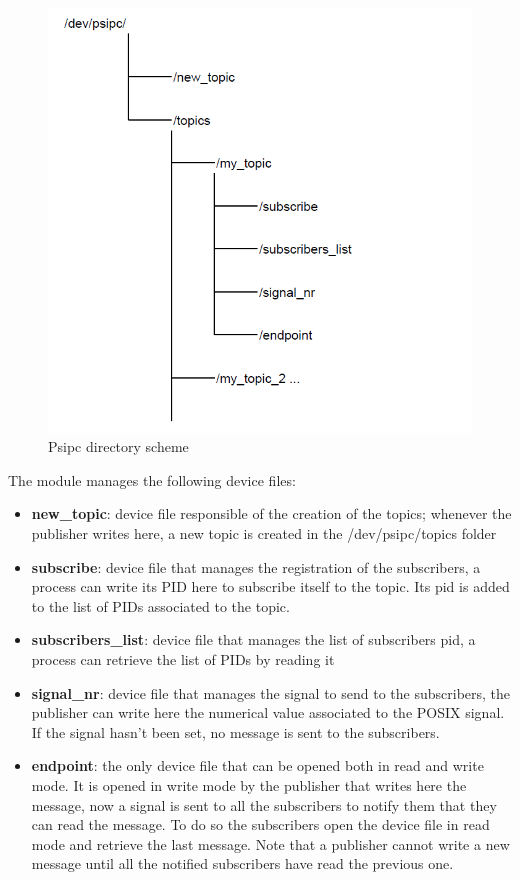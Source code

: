 \documentclass[10pt,a4]{article}
\begin{document}
\begin{center}
  \begin{figure}[H]
      \includegraphics[scale=0.50, center]{assets/psipc_scheme.png}
      \caption{Psipc directory scheme}
      \label{fig: psipc_scheme}
  \end{figure}
\end{center}

The module manages the following device files:
\begin{itemize}
  \item \textbf{new\_topic}: device file responsible of the creation of the topics; whenever the publisher writes here, a new topic is created in the /dev/psipc/topics folder
  \item \textbf{subscribe}: device file that manages the registration of the subscribers, a process can write its PID here to subscribe itself to the topic. Its pid is added to the list of PIDs associated to the topic.
  \item \textbf{subscribers\_list}: device file that manages the list of subscribers pid, a process can retrieve the list of PIDs by reading it
  \item \textbf{signal\_nr}: device file that manages the signal to send to the subscribers, the publisher can write here the numerical value associated to the POSIX signal.
  If the signal hasn't been set, no message is sent to the subscribers.
  \item \textbf{endpoint}: the only device file that can be opened both in read and write mode.
  It is opened in write mode by the publisher that writes here the message, now a signal is sent to all the subscribers to notify them that they can read the message.
  To do so the subscribers open the device file in read mode and retrieve the last message.
  Note that a publisher cannot write a new message until all the notified subscribers have read the previous one.

\end{itemize}
\end{document}
